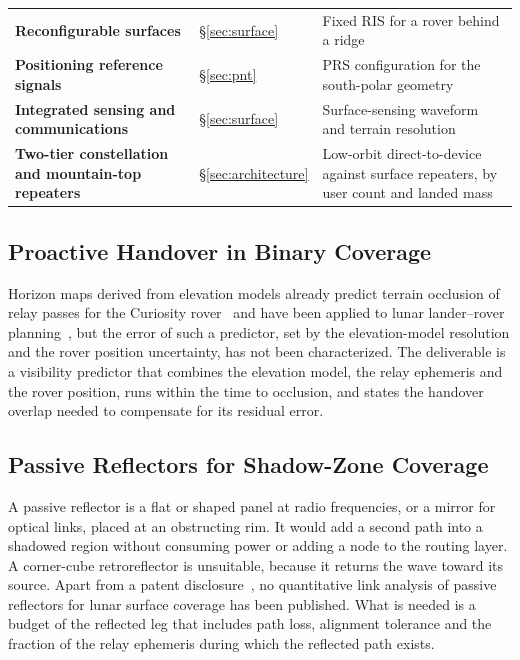 \documentclass{IEEEoj}
\begin{document}
\begin{table}[!t]
\begin{tabularx}{\textwidth}{@{}>{\raggedright\arraybackslash\bfseries}p{5.6cm}>{\raggedright\arraybackslash}p{1.9cm}>{\raggedright\arraybackslash}X}
Reconfigurable surfaces & \S\ref{sec:surface} & Fixed RIS for a rover behind a ridge \\
Positioning reference signals & \S\ref{sec:pnt} & PRS configuration for the south-polar geometry \\
Integrated sensing and communications & \S\ref{sec:surface} & Surface-sensing waveform and terrain resolution \\
Two-tier constellation and mountain-top repeaters & \S\ref{sec:architecture} & Low-orbit direct-to-device against surface repeaters, by user count and landed mass \\
\bottomrule
\end{tabularx}
\end{table}


\subsection{Proactive Handover in Binary Coverage}
Horizon maps derived from elevation models already predict terrain occlusion of relay passes for the Curiosity rover~\cite{wiederhold_mars_occlusion} and have been applied to lunar lander--rover planning~\cite{menon_teamindus}, but the error of such a predictor, set by the elevation-model resolution and the rover position uncertainty, has not been characterized. The deliverable is a visibility predictor that combines the elevation model, the relay ephemeris and the rover position, runs within the time to occlusion, and states the handover overlap needed to compensate for its residual error.

\subsection{Passive Reflectors for Shadow-Zone Coverage}
A passive reflector is a flat or shaped panel at radio frequencies, or a mirror for optical links, placed at an obstructing rim. It would add a second path into a shadowed region without consuming power or adding a node to the routing layer. A corner-cube retroreflector is unsuitable, because it returns the wave toward its source. Apart from a patent disclosure~\cite{sercel_patent_shadowed}, no quantitative link analysis of passive reflectors for lunar surface coverage has been published. What is needed is a budget of the reflected leg that includes path loss, alignment tolerance and the fraction of the relay ephemeris during which the reflected path exists.
\end{document}
